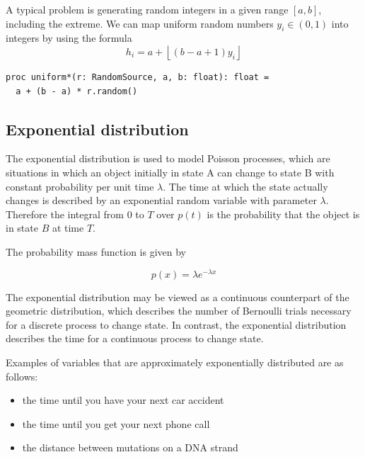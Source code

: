 \documentclass[justified, sixbynine]{tufte-book}
\def\ft{\small\tt}
\theoremstyle{plain}%
\newtheorem * {corollary}{Corollary}
\theoremstyle{definition}
\theoremstyle{remark}
\newtheorem * {remark}{Remark}
\newtheorem * {note}{Note}
\begin{document}
\begin{fullwidth}
A typical problem is generating random integers in a given range $[a, b]$, 
including the extreme. We can map uniform random numbers $y_i\in (0, 1)$
into integers by using the formula
\begin{equation}
h_i=a+\left\lfloor (b-a+1)y_i\right\rfloor
\end{equation}

\begin{lstlisting}[caption={in file: {\ft nlib/randomgen.nim}}]
proc uniform*(r: RandomSource, a, b: float): float =
  a + (b - a) * r.random()
\end{lstlisting}

\goodbreak\subsection{Exponential distribution}

The exponential distribution is used to model Poisson processes, which are
situations in which an object initially in state A can change to state B
with constant probability per unit time $\lambda $. The time at which the
state actually changes is described by an exponential random variable with
parameter $\lambda $. Therefore the integral from $0$ to $T$ over $p(t)$ is
the probability that the object is in state $B$ at time $T$.

The probability mass function is given by

\begin{equation}
p(x)=\lambda e^{-\lambda x}
\end{equation}

The exponential distribution may be viewed as a continuous counterpart of
the geometric distribution, which describes the number of Bernoulli trials
necessary for a discrete process to change state. In contrast, the
exponential distribution describes the time for a continuous process to
change state.

Examples of variables that are approximately exponentially distributed are as follows:

\begin{itemize}
\item  the time until you have your next car accident

\item  the time until you get your next phone call

\item  the distance between mutations on a DNA strand


\end{itemize}
\end{fullwidth}
\end{document}
